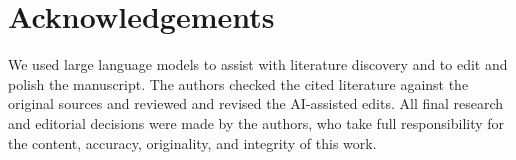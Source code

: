 \section*{Acknowledgements}

We used large language models to assist with literature discovery and to edit and polish the manuscript.
The authors checked the cited literature against the original sources and reviewed and revised the
AI-assisted edits. All final research and editorial decisions were made by the authors, who take full
responsibility for the content, accuracy, originality, and integrity of this work.
